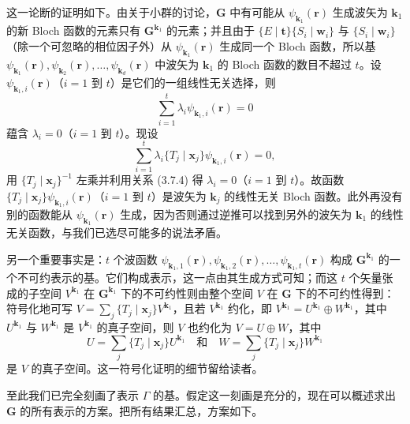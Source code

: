 这一论断的证明如下。由关于小群的讨论，$\mathbf{G}$ 中有可能从 $\psi_{\mathbf{k}_{1}}(\mathbf{r})$ 生成波矢为 $\mathbf{k}_{1}$ 的新 Bloch 函数的元素只有 $\mathbf{G}^{\mathbf{k}_{1}}$ 的元素；并且由于 $\{E \mid \mathbf{t}\}\{S_{i} \mid \mathbf{w}_{i}\}$ 与 $\{S_{i} \mid \mathbf{w}_{i}\}$（除一个可忽略的相位因子外）从 $\psi_{\mathbf{k}_{1}}(\mathbf{r})$ 生成同一个 Bloch 函数，所以基 $\psi_{\mathbf{k}_{1}}(\mathbf{r}), \psi_{\mathbf{k}_{2}}(\mathbf{r}), \dots, \psi_{\mathbf{k}_{d}}(\mathbf{r})$ 中波矢为 $\mathbf{k}_{1}$ 的 Bloch 函数的数目不超过 $t$。设 $\psi_{\mathbf{k}_{1}, i}(\mathbf{r})$（$i = 1$ 到 $t$）是它们的一组线性无关选择，则
\begin{equation*}
\sum_{i=1}^{t}\lambda_{i}\psi_{\mathbf{k}_{1}, i}(\mathbf{r}) = 0
\tag{3.7.4}
\end{equation*}
蕴含 $\lambda_{i} = 0$（$i = 1$ 到 $t$）。现设
\begin{equation*}
\sum_{i=1}^{t}\lambda_{i}\{T_{j} \mid \mathbf{x}_{j}\}\psi_{\mathbf{k}_{1}, i}(\mathbf{r}) = 0,
\end{equation*}
用 $\{T_{j} \mid \mathbf{x}_{j}\}^{-1}$ 左乘并利用关系 (3.7.4) 得 $\lambda_{i} = 0$（$i = 1$ 到 $t$）。故函数 $\{T_{j} \mid \mathbf{x}_{j}\}\psi_{\mathbf{k}_{1}, i}(\mathbf{r})$（$i = 1$ 到 $t$）是波矢为 $\mathbf{k}_{j}$ 的线性无关 Bloch 函数。此外再没有别的函数能从 $\psi_{\mathbf{k}_{1}}(\mathbf{r})$ 生成，因为否则通过逆推可以找到另外的波矢为 $\mathbf{k}_{1}$ 的线性无关函数，与我们已选尽可能多的说法矛盾。

另一个重要事实是：$t$ 个波函数 $\psi_{\mathbf{k}_{1}, 1}(\mathbf{r}), \psi_{\mathbf{k}_{1}, 2}(\mathbf{r}), \dots, \psi_{\mathbf{k}_{1}, t}(\mathbf{r})$ 构成 $\mathbf{G}^{\mathbf{k}_{1}}$ 的一个不可约表示的基。它们构成表示，这一点由其生成方式可知；而这 $t$ 个矢量张成的子空间 $V^{\mathbf{k}_{1}}$ 在 $\mathbf{G}^{\mathbf{k}_{1}}$ 下的不可约性则由整个空间 $V$ 在 $\mathbf{G}$ 下的不可约性得到：符号化地可写 $V = \sum_{j}\{T_{j} \mid \mathbf{x}_{j}\}V^{\mathbf{k}_{1}}$，且若 $V^{\mathbf{k}_{1}}$ 约化，即 $V^{\mathbf{k}_{1}} = U^{\mathbf{k}_{1}} \oplus W^{\mathbf{k}_{1}}$，其中 $U^{\mathbf{k}_{1}}$ 与 $W^{\mathbf{k}_{1}}$ 是 $V^{\mathbf{k}_{1}}$ 的真子空间，则 $V$ 也约化为 $V = U \oplus W$，其中
\begin{equation*}
U = \sum_{j}\{T_{j} \mid \mathbf{x}_{j}\}U^{\mathbf{k}_{1}} \quad\text{和}\quad W = \sum_{j}\{T_{j} \mid \mathbf{x}_{j}\}W^{\mathbf{k}_{1}}
\end{equation*}
是 $V$ 的真子空间。这一符号化证明的细节留给读者。

至此我们已完全刻画了表示 $\Gamma$ 的基。假定这一刻画是充分的，现在可以概述求出 $\mathbf{G}$ 的所有表示的方案。把所有结果汇总，方案如下。

